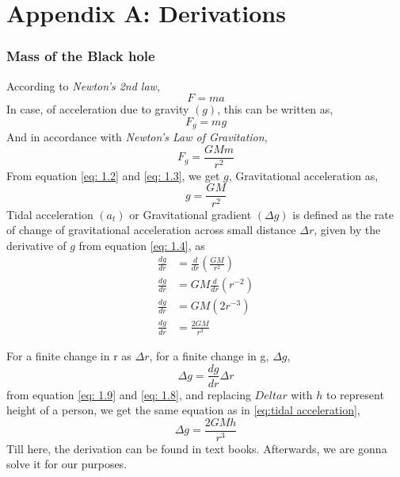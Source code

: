 \appendix
\chapter*{Appendix A: Derivations}

\subsection{Mass of the Black hole}

According to \emph{Newton's 2nd law},
\begin{equation} \label{eq: 1.1}
F = ma \tag{1.1}
\end{equation}
In case, of acceleration due to gravity \((g)\), this can be written as, 
\begin{equation} \label{eq: 1.2}
F_g = mg \tag{1.2}
\end{equation}
And in accordance with \emph{Newton's Law of Gravitation}, 
\begin{equation} \label{eq: 1.3}
F_g = \frac{GMm}{r^2} \tag{1.3}
\end{equation}
From equation \eqref{eq: 1.2} and \eqref{eq: 1.3}, we get \(g\), Gravitational acceleration as, 
\begin{equation} \label{eq: 1.4}
g = \frac{GM}{r^2} \tag{1.4}
\end{equation}
Tidal acceleration \((a_t)\) or Gravitational gradient \((\Delta g)\) is defined as the rate of change of gravitational acceleration across small distance \(\Delta r\), given by the derivative of \(g\) from equation \eqref{eq: 1.4}, as
\begin{align} \label{eq: 1.8}
    \frac{dg}{dr} &= \frac{d}{dr} (\frac{GM}{r^2}) \tag{1.5}\\
    \frac{dg}{dr} &= GM\frac{d}{dr} (r^{-2}) \tag{1.6}\\
    \frac{dg}{dr} &= GM (2 r^{-3}) \tag{1.7}\\
    \frac{dg}{dr} &= \frac{2GM}{r^{3}} \tag{1.8}
\end{align}

For a finite change in r as \(\Delta r\), for a finite change in g, \(\Delta g\),
\begin{equation} \label{eq: 1.9}
\Delta g = \frac{dg}{dr} \Delta r \tag{1.9}
\end{equation}
from equation \eqref{eq: 1.9} and \eqref{eq: 1.8}, and replacing \(Delta r\) with \(h\) to represent height of a person, we get the same equation as in \eqref{eq:tidal acceleration}, 
\begin{equation} \label{eq: 1.10}
\Delta g = \frac{2GMh}{r^{3}} \tag{1.10}
\end{equation}
Till here, the derivation can be found in text books. Afterwards, we are gonna solve it for our purposes. 

